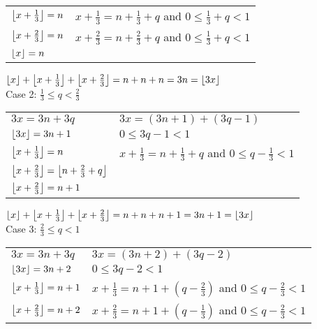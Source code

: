 \documentclass[11pt]{article}
\DeclarePairedDelimiter\floor{\lfloor}{\rfloor}
\begin{document}
\begin{enumerate}
\begin{tabular}{ll}
			$\floor*{x + \frac{1}{3}} = n$ &
			$x+\frac{1}{3} = n + \frac{1}{3} + q$ and
			$0 \leq \frac{1}{3} +q < 1$\\

			$\floor*{x + \frac{2}{3}} = n$ &
			$x+\frac{2}{3} = n + \frac{2}{3} + q$ and
			$0 \leq \frac{1}{3} + q < 1$\\

			$\floor*{x} = n$ \\

		\end{tabular}

		$\floor*{x} + \floor*{x + \frac{1}{3}} +
		\floor*{x + \frac{2}{3}} = n + n + n = 3n =
		\floor*{3x}$ \\

		Case 2: $\frac{1}{3} \leq q < \frac{2}{3}$

		\begin{tabular}{ll}
			$3x = 3n + 3q$ & $3x = (3n + 1) + (3q-1)$\\

			$\floor*{3x} = 3n + 1$ & $0 \leq 3q -1<1$\\

			$\floor*{x + \frac{1}{3}} = n$ &
			$x + \frac{1}{3} = n + \frac{1}{3} + q$ and
			$0 \leq q - \frac{1}{3} < 1$ \\

			$\floor*{x + \frac{2}{3} }=
			\floor*{n + \frac{2}{3} + q}$ \\

			$\floor*{x + \frac{2}{3}} = n + 1$ \\

		\end{tabular}

		$\floor*{x} + \floor*{x + \frac{1}{3} } +
		\floor*{x + \frac{2}{3} } = n + n + n + 1 = 3n + 1
		= \floor*{3x}$ \\

		Case 3: $\frac{2}{3} \leq q < 1$

		\begin{tabular}{ll}
			$3x = 3n + 3q$ & $3x = (3n + 2)+(3q - 2)$\\

			$\floor*{3x} = 3n + 2$ & $0 \leq 3q-2 < 1$\\

			$\floor*{x + \frac{1}{3}} = n + 1$ &
			$x + \frac{1}{3} = n+1+ (q-\frac{2}{3})$ and
			$0 \leq q - \frac{2}{3} < 1$ \\


			$\floor*{x + \frac{2}{3}} = n + 2$ &
			$x + \frac{2}{3} = n+1+ (q-\frac{1}{3})$ and
			$0 \leq q - \frac{2}{3} < 1$ \\


\end{tabular}
\end{enumerate}
\end{document}

